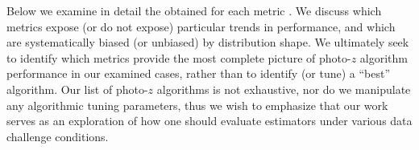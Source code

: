\documentclass[fleqn,usenatbib,useAMS]{mnras}
\newcommand{\PersonalTag}[3]{{\color{#2}{$^{#1}$ [#3}]}}
\newcommand{\aim}[1]{\PersonalTag{Alex}{violet}{#1}}
\newcommand{\refresponse}[1]{{\color{black}{#1}}}
\newcommand{\revone}[2]{{\color{black}{#2}}}
\begin{document}
Below we examine in detail the \revone{results}{values} obtained for \revone{each estimator using}{} each metric \revone{}{as evaluated over each estimator's $p(z)$ results for many cases of training set imperfection}. 
\revone{We divide our analysis into two sections, considering inverse redshift incompleteness and spectroscopic degraders separately.}{}
We discuss which metrics expose (or do not expose) particular trends in performance, and which are systematically biased (or unbiased) by distribution shape. 
We ultimately seek to identify which \refresponse{set of} metrics provide the most complete picture of photo-$z$ algorithm performance in our examined cases, rather than to identify (or tune) a ``best'' algorithm. 
Our list of photo-$z$ algorithms is not exhaustive, nor do we manipulate any algorithmic tuning parameters, thus we wish to emphasize that our work serves as an exploration of how one should evaluate estimators under various data challenge conditions. 
\revone{}{We divide our analysis into two sections, considering inverse redshift incompleteness and spectroscopic degraders separately.}





\end{document}
